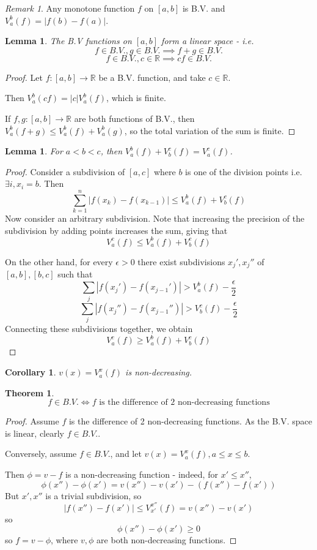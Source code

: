 \documentclass[11pt,a4paper]{report}
\newtheorem{lemma}[theorem]{Lemma}
\newtheorem{corollary}[theorem]{Corollary}
\theoremstyle{plain}
\newtheorem{thm}{Theorem}[section]
\theoremstyle{definition}
\theoremstyle{remark}
\newtheorem*{rem}{Remark}
\newcommand{\R}{\mathbb{R}}
\newcommand{\abs}[1]{\left| #1 \right|}
\begin{document}
\begin{rem}
    Any monotone function $f$ on $[a, b]$ is B.V. and $V_a^b(f) = \abs{f(b) - f(a)}$.
\end{rem}

\begin{lemma}
  The B.V functions on $[a, b]$ form a linear space - i.e.
  $$ f \in B.V., g \in B.V. \implies f + g \in B.V. $$
  $$ f \in B.V., c \in \R \implies c f \in B.V. $$
\end{lemma}

\begin{proof}
  Let $f : [a, b] \to \R$ be a B.V. function, and take $c \in \R$.

  Then $V_a^b(cf) = \abs{c}V_a^b(f)$, which is finite.

  If $f, g: [a, b] \to \R$ are both functions of B.V., then $V_a^b(f + g) \le V_a^b(f) + V_a^b(g)$, so the total variation of the sum is finite.
\end{proof}

\begin{lemma}
  For $a < b < c$, then $V_a^b(f) + V_b^c(f) = V_a^c(f)$.
\end{lemma}

\begin{proof}
  Consider a subdivision of $[a, c]$ where $b$ is one of the division points i.e. $\exists i, x_i = b$. Then
  $$ \sum_{k=1}^n \abs{f(x_k) - f(x_{k-1})} \le V_a^b (f) + V_b^c (f) $$
  Now consider an arbitrary subdivision. Note that increasing the precision of the subdivision by adding points increases the sum, giving that
  $$ V_a^c (f) \le V_a^b(f) + V_b^c(f) $$

  On the other hand, for every $\epsilon > 0$ there exist subdivisions $x_j', x_j''$ of $[a, b], [b, c]$ such that
  $$ \sum_j \abs{f(x_j') - f(x_{j-1}')} > V_a^b(f) - \frac{\epsilon}{2} $$
  $$ \sum_j \abs{f(x_j'') - f(x_{j-1}'')} > V_b^c(f) - \frac{\epsilon}{2} $$
  Connecting these subdivisions together, we obtain
  $$ V_a^c (f) \ge V_a^b(f) + V_b^c (f) $$
\end{proof}

\begin{corollary}
  $v(x) = V_a^x(f)$ is non-decreasing.
\end{corollary}

\begin{thm}
  $$ f \in B.V. \iff f \text{ is the difference of 2 non-decreasing functions} $$
\end{thm}

\begin{proof}
  Assume $f$ is the difference of 2 non-decreasing functions. As the B.V. space is linear, clearly $f \in B.V.$.

  Conversely, assume $f \in B.V.$, and let $v(x) = V_a^x(f), a \le x \le b$.

  Then $\phi = v - f$ is a non-decreasing function - indeed, for $x' \le x''$,
  $$ \phi(x'') - \phi(x') = v(x'') - v(x') - (f(x'') - f(x')) $$
  But $x', x''$ is a trivial subdivision, so
  $$ \abs{f(x'') - f(x')} \le V_{x'}^{x''} (f) = v(x'') - v(x') $$
  so
  $$ \phi(x'') - \phi(x') \ge 0$$
  so $f = v - \phi$, where $v, \phi$ are both non-decreasing functions.
\end{proof}
\end{document}
